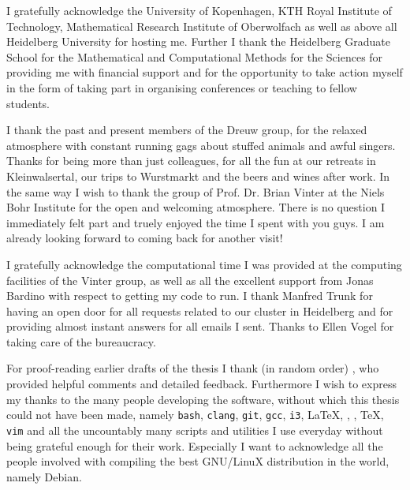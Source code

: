 
I gratefully acknowledge
the University of Kopenhagen,
KTH Royal Institute of Technology,
Mathematical Research Institute of Oberwolfach
as well as above all
Heidelberg University
for hosting me.
Further I thank the Heidelberg Graduate School
for the Mathematical and Computational Methods for the Sciences
for providing me with financial support
and for the opportunity to take action myself
in the form of taking part in organising conferences
or teaching to fellow students.

I thank the past and present members of the Dreuw group,
for the relaxed atmosphere
with constant running gags about
stuffed animals and awful singers.
Thanks for being more than just colleagues,
for all the fun
at our retreats in Kleinwalsertal, our trips to Wurstmarkt and
the beers and wines after work.
In the same way I wish to thank
the group of Prof. Dr. Brian Vinter at the Niels Bohr Institute
for the open and welcoming atmosphere.
There is no question I immediately felt part
and truely enjoyed the time I spent with you guys.
I am already looking forward to coming back for another visit!

I gratefully acknowledge the computational time I was provided
at the computing facilities of the Vinter group,
as well as all the excellent support from Jonas Bardino
with respect to getting my code to run.
I thank Manfred Trunk
for having an open door for all requests related
to our cluster in Heidelberg
and for providing almost instant answers for all emails I sent.
Thanks to Ellen Vogel for taking care of the bureaucracy.


For proof-reading earlier drafts of the thesis I thank
(in random order)
,%
who provided helpful comments and detailed feedback.
Furthermore I wish to express my thanks to the many people developing
the software, without which this thesis could not have been made,
namely
\texttt{bash},
\texttt{clang},
\texttt{git},
\texttt{gcc},
\texttt{i3},
\LaTeX,
\numpy,
\python,
\TeX,
\texttt{vim}
and all the uncountably many scripts and utilities
I use everyday without being grateful enough for their work.
Especially I want to acknowledge all the people
involved with compiling the best 
GNU/LinuX distribution in the world, namely Debian.



